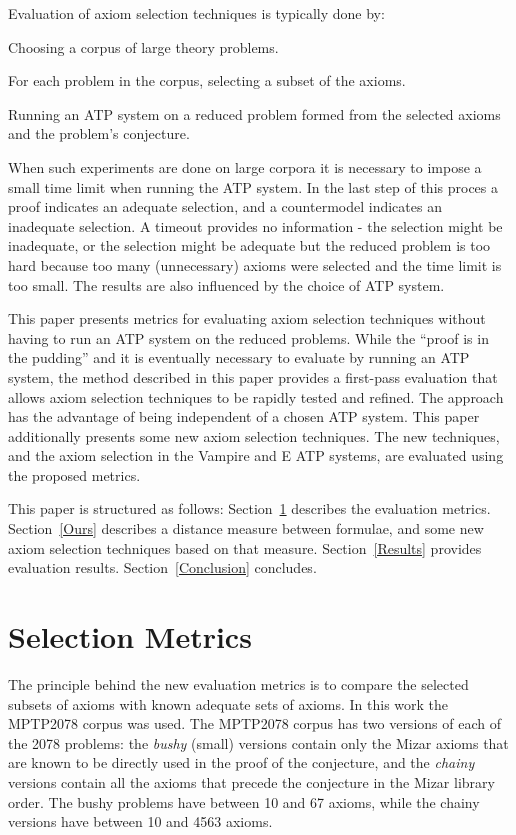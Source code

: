 \documentclass[EPiC]{easychair}
\newenvironment{packed_enumerate}{
\vspace*{-0.5em}
\begin{enumerate}
  \setlength{\partopsep}{0pt}
  \setlength{\itemsep}{1pt}
  \setlength{\parskip}{0pt}
  \setlength{\parsep}{0pt}
}{\end{enumerate}}
\begin{document}
Evaluation of axiom selection techniques is typically done by:
\begin{packed_enumerate}
\item Choosing a corpus of large theory problems.
\item For each problem in the corpus, selecting a subset of the axioms.
\item Running an ATP system on a reduced problem formed from the selected 
      axioms and the problem's conjecture.
\end{packed_enumerate}
When such experiments are done on large corpora it is necessary to impose
a small time limit when running the ATP system.
In the last step of this proces a proof indicates an adequate selection,
and a countermodel indicates an inadequate selection. 
A timeout provides no information - the selection might be inadequate, or
the selection might be adequate but the reduced problem is too hard because 
too many (unnecessary) axioms were selected and the time limit is too small.
The results are also influenced by the choice of ATP system.

This paper presents metrics for evaluating axiom selection techniques
without having to run an ATP system on the reduced problems.
While the ``proof is in the pudding'' and it is eventually necessary to
evaluate by running an ATP system, the method described in this paper
provides a first-pass evaluation that allows axiom selection techniques to
be rapidly tested and refined.
The approach has the advantage of being independent of a chosen ATP system.
This paper additionally presents some new axiom selection techniques. 
The new techniques, and the axiom selection in the Vampire \cite{KV13} 
and E \cite{SCV19} ATP systems, are evaluated using the proposed metrics.

This paper is structured as follows:
Section~\ref{Metrics} describes the evaluation metrics.
Section~\ref{Ours} describes a distance measure between formulae, and
some new axiom selection techniques based on that measure.
Section~\ref{Results} provides evaluation results.
Section~\ref{Conclusion} concludes.

\section{Selection Metrics}
\label{Metrics}

The principle behind the new evaluation metrics is to compare the selected
subsets of axioms with known adequate sets of axioms.
In this work the MPTP2078 corpus was used.
The MPTP2078 corpus has two versions of each of the 2078 problems: 
the \emph{bushy} (small) versions contain only the Mizar axioms that are
known to be directly used in the proof of the conjecture, and 
the \emph{chainy} versions contain all the axioms that precede the conjecture
in the Mizar library order.
The bushy problems have between 10 and 67 axioms, while the chainy versions
have between 10 and 4563 axioms.
\end{document}
